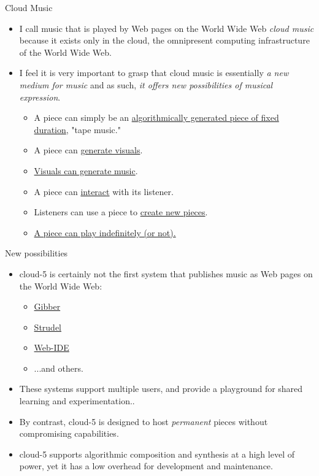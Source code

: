 \documentclass{beamer}
\begin{document}
\begin{frame}{Cloud Music}
\begin{itemize}
\item I call music that is played by Web pages on the World Wide Web \emph{cloud music} because it exists only in the cloud, the omnipresent computing infrastructure of the World Wide Web.
\item I feel it is very important to grasp that cloud music is essentially \emph{a new medium for music} and as such,\emph{ it offers new possibilities of musical expression}.
\begin{itemize}
\item A piece can simply be an \href{http://localhost:8000/cloud5-example-score-generator.html}{algorithmically generated piece of fixed duration}, "tape music."
\item A piece can \href{http://localhost:8000/cloud_music_no_2.html}{generate visuals}.
\item \href{http://localhost:8000/cloud_music_no_1.html}{Visuals can generate music}.
\item A piece can \href{http://localhost:8000/cloud5-example-visual-music.html}{interact} with its listener.
\item Listeners can use a piece to \href{http://localhost:8000/cancycle.html}{create new pieces}.
\item \href{http://localhost:8000/cancycle.html}{A piece can play indefinitely (or not).}
\end{itemize}
\end{itemize}
\end{frame}

\begin{frame}{New possibilities}
\begin{itemize}
\item cloud-5 is certainly not the first system that publishes music as Web pages on the World Wide Web:
\begin{itemize}
\item \href{https://gibber.cc/playground/}{Gibber}
\item \href{https://strudel.cc/}{Strudel}
\item \href{https://ide.csound.com/}{Web-IDE}
\item ...and others.
\end{itemize}
\item These systems support multiple users, and provide a playground for shared learning and experimentation..
\item By contrast, cloud-5 is designed to host \emph{permanent} pieces without compromising capabilities.
\item cloud-5 supports algorithmic composition and synthesis at a high level of power, yet it has a low overhead for development and maintenance.
\end{itemize}
\end{frame}
\end{document}
